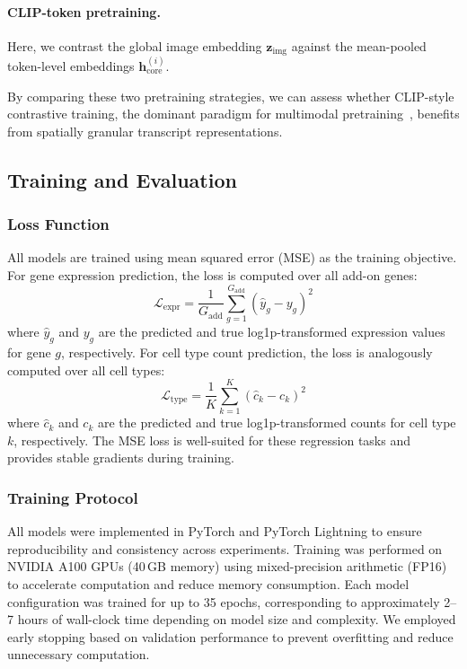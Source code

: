 \paragraph{CLIP-token pretraining.}
Here, we contrast the global image embedding $\mathbf{z}_{\text{img}}$ against the mean-pooled token-level embeddings $\mathbf{h}_{\text{core}}^{(i)}$.

By comparing these two pretraining strategies, we can assess whether CLIP-style contrastive training, the dominant paradigm for multimodal pretraining~\cite{radford_learningtransferablevisual_2021}, benefits from spatially granular transcript representations.

\subsection*{Training and Evaluation}
\label{sec:training-and-evaluation}

\subsubsection{Loss Function}
\label{sec:loss-function}

All models are trained using mean squared error (MSE) as the training objective. For gene expression prediction, the loss is computed over all add-on genes:
\begin{equation}
\mathcal{L}_{\text{expr}} = \frac{1}{G_{\text{add}}}\sum_{g=1}^{G_{\text{add}}} (\hat{y}_g - y_g)^2
\end{equation}
where $\hat{y}_g$ and $y_g$ are the predicted and true log1p-transformed expression values for gene $g$, respectively. For cell type count prediction, the loss is analogously computed over all cell types:
\begin{equation}
\mathcal{L}_{\text{type}} = \frac{1}{K}\sum_{k=1}^{K} (\hat{c}_k - c_k)^2
\end{equation}
where $\hat{c}_k$ and $c_k$ are the predicted and true log1p-transformed counts for cell type $k$, respectively. The MSE loss is well-suited for these regression tasks and provides stable gradients during training.

\subsubsection{Training Protocol}
\label{sec:training-protocol}

All models were implemented in PyTorch and PyTorch Lightning to ensure reproducibility and consistency across experiments. Training was performed on NVIDIA A100 GPUs (40\,GB memory) using mixed-precision arithmetic (FP16) to accelerate computation and reduce memory consumption. Each model configuration was trained for up to 35 epochs, corresponding to approximately 2--7 hours of wall-clock time depending on model size and complexity. 
We employed early stopping based on validation performance to prevent overfitting and reduce unnecessary computation.

